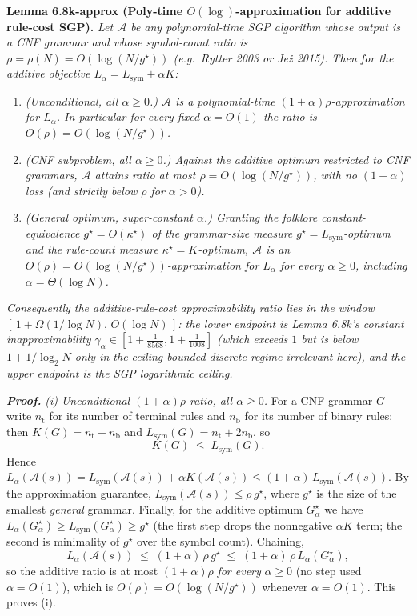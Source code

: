 \documentclass[
]{article}
\begin{document}
\textbf{Lemma 6.8k-approx (Poly-time $O(\log)$-approximation for additive
rule-cost SGP).} \emph{Let $\mathcal A$ be any polynomial-time SGP
algorithm whose output is a CNF grammar and whose symbol-count ratio is
$\rho = \rho(N) = O(\log(N/g^\star))$ (e.g.\ Rytter 2003 or Je\.z 2015).
Then for the additive objective $L_\alpha = L_{\mathrm{sym}} + \alpha K$:}
\begin{enumerate}
\item[(i)] \emph{(Unconditional, all $\alpha \geq 0$.) $\mathcal A$ is a
polynomial-time $(1+\alpha)\rho$-approximation for $L_\alpha$. In
particular for every fixed $\alpha = O(1)$ the ratio is
$O(\rho) = O(\log(N/g^\star))$.}
\item[(ii)] \emph{(CNF subproblem, all $\alpha \geq 0$.) Against the
additive optimum restricted to CNF grammars, $\mathcal A$ attains ratio
at most $\rho = O(\log(N/g^\star))$, with no $(1+\alpha)$ loss (and
strictly below $\rho$ for $\alpha > 0$).}
\item[(iii)] \emph{(General optimum, super-constant $\alpha$.) Granting the
folklore constant-equivalence $g^\star = O(\kappa^\star)$ of the
grammar-size measure $g^\star = L_{\mathrm{sym}}$-optimum and the
rule-count measure $\kappa^\star = K$-optimum, $\mathcal A$ is an
$O(\rho) = O(\log(N/g^\star))$-approximation for $L_\alpha$ for
\emph{every} $\alpha \geq 0$, including $\alpha = \Theta(\log N)$.}
\end{enumerate}
\emph{Consequently the additive-rule-cost approximability ratio lies in the
window $[\,1+\Omega(1/\log N),\,O(\log N)\,]$: the lower endpoint is
Lemma 6.8k's constant inapproximability $\gamma_\alpha \in
[1+\tfrac{1}{8568}, 1+\tfrac{1}{1008}]$ (which exceeds $1$ but is below
$1+1/\log_2 N$ only in the ceiling-bounded discrete regime irrelevant
here), and the upper endpoint is the SGP logarithmic ceiling.}

\emph{\textbf{Proof.}} \emph{(i) Unconditional $(1+\alpha)\rho$ ratio,
all $\alpha \geq 0$.} For a CNF grammar $G$ write $n_{\mathrm{t}}$ for
its number of terminal rules and $n_{\mathrm{b}}$ for its number of
binary rules; then $K(G) = n_{\mathrm{t}} + n_{\mathrm{b}}$ and
$L_{\mathrm{sym}}(G) = n_{\mathrm{t}} + 2n_{\mathrm{b}}$, so
\begin{equation}
K(G) \;\leq\; L_{\mathrm{sym}}(G). \tag{NF}
\end{equation}
Hence $L_\alpha(\mathcal A(s)) = L_{\mathrm{sym}}(\mathcal A(s)) +
\alpha K(\mathcal A(s)) \leq (1+\alpha)\,L_{\mathrm{sym}}(\mathcal A(s))$.
By the approximation guarantee,
$L_{\mathrm{sym}}(\mathcal A(s)) \leq \rho\,g^\star$, where $g^\star$ is
the size of the smallest \emph{general} grammar. Finally, for the
additive optimum $G^\star_\alpha$ we have
$L_\alpha(G^\star_\alpha) \geq L_{\mathrm{sym}}(G^\star_\alpha) \geq
g^\star$ (the first step drops the nonnegative $\alpha K$ term; the
second is minimality of $g^\star$ over the symbol count). Chaining,
\[
L_\alpha(\mathcal A(s)) \;\leq\; (1+\alpha)\,\rho\,g^\star
\;\leq\; (1+\alpha)\,\rho\,L_\alpha(G^\star_\alpha),
\]
so the additive ratio is at most $(1+\alpha)\rho$ \emph{for every}
$\alpha \geq 0$ (no step used $\alpha = O(1)$), which is $O(\rho) =
O(\log(N/g^\star))$ whenever $\alpha = O(1)$. This proves (i).
\end{document}
